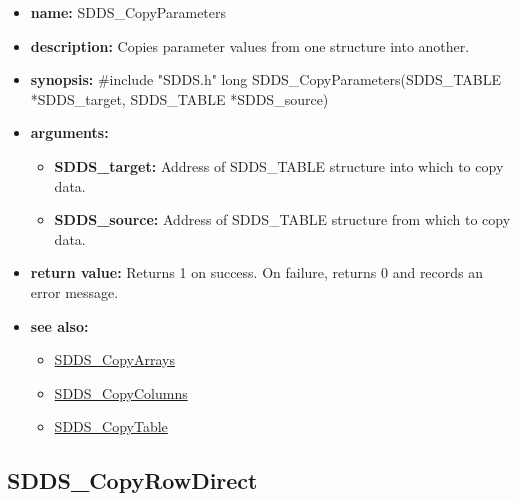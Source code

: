 \documentclass[11pt]{article}
\newcommand{\progref}[1]{\hyperref{SDDS_#1}{{\tt SDDS\_#1} (}{)}{SDDS_#1}}
\begin{document}
\begin{itemize}
\item {\bf name:}\newline
SDDS\_CopyParameters
\item {\bf description:}\newline
Copies parameter values from one structure into another.
\item {\bf synopsis:} \#include "SDDS.h"\newline
long SDDS\_CopyParameters(SDDS\_TABLE *SDDS\_target, SDDS\_TABLE *SDDS\_source)
\item {\bf arguments:}
\begin{itemize}
\item {\bf SDDS\_target:} Address of SDDS\_TABLE structure into which to copy data.
\item {\bf SDDS\_source:} Address of SDDS\_TABLE structure from which to copy data.
\end{itemize}
\item {\bf return value:}\newline
Returns 1 on success. On failure, returns 0 and records an error message.
\item {\bf see also:}
\begin{itemize}
\item \progref{CopyArrays}
\item \progref{CopyColumns}
\item \progref{CopyTable}
\end{itemize}
\end{itemize}

\subsection{SDDS\_CopyRowDirect}
\label{SDDS_CopyRowDirect}
\end{document}
